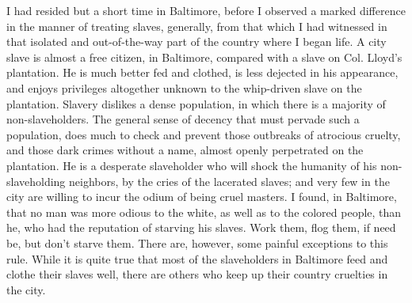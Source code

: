 I had resided but a short time in Baltimore, before I observed a marked
difference in the manner of treating slaves, generally, from that which
I had witnessed in that isolated and out-of-the-way part of the country
where I began life. A city slave is almost a free citizen, in Baltimore,
compared with a slave on Col. Lloyd's plantation. He is much better fed
and clothed, is less dejected in his appearance, and enjoys privileges
altogether unknown to the whip-driven slave on the plantation. Slavery
dislikes a dense {}population, in which there is a majority of
non-slaveholders. The general sense of decency that must pervade such a
population, does much to check and prevent those outbreaks of atrocious
cruelty, and those dark crimes without a name, almost openly perpetrated
on the plantation. He is a desperate slaveholder who will shock the
humanity of his non-slaveholding neighbors, by the cries of the
lacerated slaves; and very few in the city are willing to incur the
odium of being cruel masters. I found, in Baltimore, that no man was
more odious to the white, as well as to the colored people, than he, who
had the reputation of starving his slaves. Work them, flog them, if need
be, but don't starve them. There are, however, some painful exceptions
to this rule. While it is quite true that most of the slaveholders in
Baltimore feed and clothe their slaves well, there are others who keep
up their country cruelties in the city.

